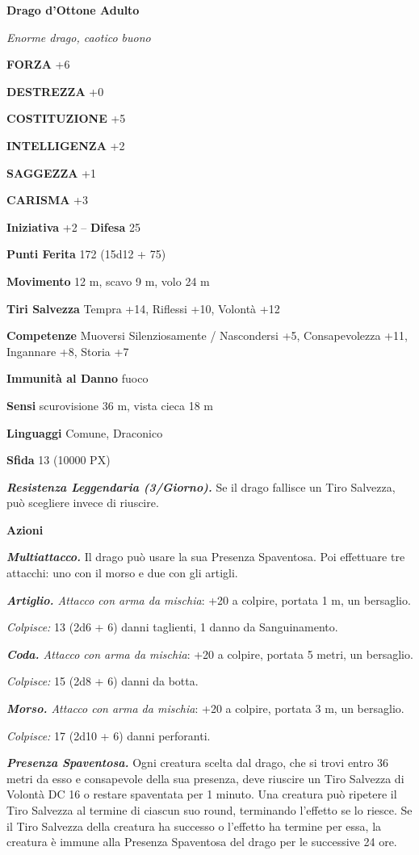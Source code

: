 \begin{multicols}{2}
	\medskip{}\textbf{Drago d'Ottone Adulto}

	\textit{Enorme drago, caotico buono}

	\textbf{FORZA} +6

	\textbf{DESTREZZA} +0

	\textbf{COSTITUZIONE} +5

	\textbf{INTELLIGENZA} +2

	\textbf{SAGGEZZA} +1

	\textbf{CARISMA} +3

	\textbf{Iniziativa} +2 -- \textbf{Difesa} 25

	\textbf{Punti Ferita} 172 (15d12 + 75)

	\textbf{Movimento} 12 m, scavo 9 m, volo 24 m

	\textbf{Tiri Salvezza} Tempra +14, Riflessi +10, Volontà +12

	\textbf{Competenze} Muoversi Silenziosamente / Nascondersi +5, Consapevolezza +11, Ingannare +8, Storia +7

	\textbf{Immunità al Danno} fuoco

	\textbf{Sensi} scurovisione 36 m, vista cieca 18 m

	\textbf{Linguaggi} Comune, Draconico

	\textbf{Sfida} 13 (10000 PX)

	\textit{\textbf{Resistenza Leggendaria (3/Giorno).}} Se il drago fallisce un Tiro Salvezza, può scegliere invece di riuscire.

	\textbf{Azioni}

	\textit{\textbf{Multiattacco.}} Il drago può usare la sua Presenza Spaventosa. Poi effettuare tre attacchi: uno con il morso e due con gli artigli.

	\textit{\textbf{Artiglio.} Attacco con arma da mischia}: +20 a colpire, portata 1 m, un bersaglio.

	\textit{Colpisce:} 13 (2d6 + 6) danni taglienti, 1 danno da Sanguinamento.

	\textit{\textbf{Coda.} Attacco con arma da mischia}: +20 a colpire, portata 5 metri, un bersaglio.

	\textit{Colpisce:} 15 (2d8 + 6) danni da botta.

	\textit{\textbf{Morso.} Attacco con arma da mischia}: +20 a colpire, portata 3 m, un bersaglio.

	\textit{Colpisce:} 17 (2d10 + 6) danni perforanti.

	\textit{\textbf{Presenza Spaventosa.}} Ogni creatura scelta dal drago, che si trovi entro 36 metri da esso e consapevole della sua presenza, deve riuscire un Tiro Salvezza di Volontà DC 16 o restare spaventata per 1 minuto. Una creatura può ripetere il Tiro Salvezza al termine di ciascun suo round, terminando l'effetto se lo riesce. Se il Tiro Salvezza della creatura ha successo o l'effetto ha termine per essa, la creatura è immune alla Presenza Spaventosa del drago per le successive 24 ore.


\end{multicols}
